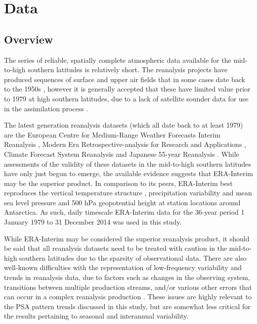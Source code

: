 \section{Data}

\subsection{Overview}

The series of reliable, spatially complete atmospheric data available for the mid-to-high southern latitudes is relatively short. The reanalysis projects have produced sequences of surface and upper air fields that in some cases date back to the 1950s \citep{Kistler2001,Uppala2005,Kobayashi2015}, however it is generally accepted that these have limited value prior to 1979 at high southern latitudes, due to a lack of satellite sounder data for use in the assimilation process \citep{Hines2000}.

The latest generation reanalysis datasets (which all date back to at least 1979) are the European Centre for Medium-Range Weather Forecasts Interim Reanalysis \citep[ERA-Interim;][]{Dee2011}, Modern Era Retrospective-analysis for Research and Applications \citep[Merra;][]{Rienecker2011}, Climate Forecast System Reanalysis \citep[CFSR;][]{Saha2010} and Japanese 55-year Reanalysis \citep[JRA-55;][]{Kobayashi2015}. While assessments of the validity of these datasets in the mid-to-high southern latitudes have only just begun to emerge, the available evidence suggests that ERA-Interim may be the superior product. In comparison to its peers, ERA-Interim best reproduces the vertical temperature structure \citep{Screen2012}, precipitation variability \citep{Bromwich2011,Nicolas2011} and mean sea level pressure and 500 hPa geopotential height at station locations \citep{Bracegirdle2012} around Antarctica. As such, daily timescale ERA-Interim data for the 36-year period 1 January 1979 to 31 December 2014 was used in this study.

While ERA-Interim may be considered the superior reanalysis product, it should be said that all reanalysis datasets need to be treated with caution in the mid-to-high southern latitudes due to the sparsity of observational data. There are also well-known difficulties with the representation of low-frequency variability and trends in reanalysis data, due to factors such as changes in the observing system, transitions between multiple production streams, and/or various other errors that can occur in a complex reanalysis production \citep{Dee2014}. These issues are highly relevant to the PSA pattern trends discussed in this study, but are somewhat less critical for the results pertaining to seasonal and interannual variability.

